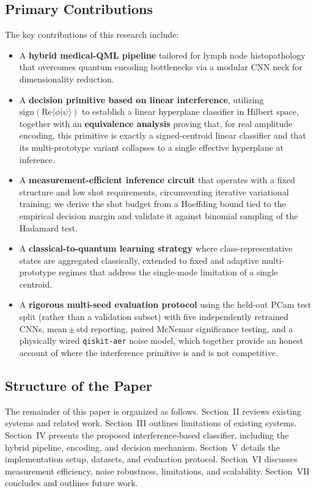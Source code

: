 \documentclass[conference]{IEEEtran}
\begin{document}
\subsection{Primary Contributions}
The key contributions of this research include:
\begin{itemize}
    \item A \textbf{hybrid medical-QML pipeline} tailored for lymph node histopathology that overcomes quantum encoding bottlenecks via a modular CNN neck for dimensionality reduction.
    \item A \textbf{decision primitive based on linear interference}, utilizing $\mathrm{sign}(\mathrm{Re}\langle\phi|\psi\rangle)$ to establish a linear hyperplane classifier in Hilbert space, together with an \textbf{equivalence analysis} proving that, for real amplitude encoding, this primitive is exactly a signed-centroid linear classifier and that its multi-prototype variant collapses to a single effective hyperplane at inference.
    \item A \textbf{measurement-efficient inference circuit} that operates with a fixed structure and low shot requirements, circumventing iterative variational training; we derive the shot budget from a Hoeffding bound tied to the empirical decision margin and validate it against binomial sampling of the Hadamard test.
    \item A \textbf{classical-to-quantum learning strategy} where class-representative states are aggregated classically, extended to fixed and adaptive multi-prototype regimes that address the single-mode limitation of a single centroid.
    \item A \textbf{rigorous multi-seed evaluation protocol} using the held-out PCam test split (rather than a validation subset) with five independently retrained CNNs, mean\,$\pm$\,std reporting, paired McNemar significance testing, and a physically wired \texttt{qiskit-aer} noise model, which together provide an honest account of where the interference primitive is and is not competitive.
\end{itemize}

\subsection{Structure of the Paper}
The remainder of this paper is organized as follows. Section~II reviews existing systems and related work. Section~III outlines limitations of existing systems. Section~IV presents the proposed interference-based classifier, including the hybrid pipeline, encoding, and decision mechanism. Section~V details the implementation setup, datasets, and evaluation protocol. Section~VI discusses measurement efficiency, noise robustness, limitations, and scalability. Section~VII concludes and outlines future work.
\end{document}
